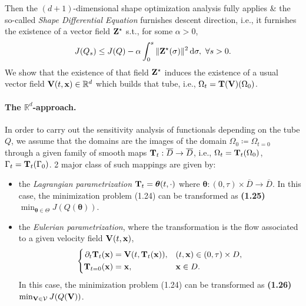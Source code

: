 \documentclass[oneside]{book}
\numberwithin{equation}{section}
\begin{document}
Then the $(d + 1)$-dimensional shape optimization analysis fully applies \& the so-called \textit{Shape Differential Equation} furnishes descent direction, i.e., it furnishes the existence of a vector field ${\bf Z}^\star$ s.t., for some $\alpha > 0$,
\begin{align*}
	J(Q_s)\le J(Q) - \alpha\int_0^s \|{\bf Z}^\star(\sigma)\|^2\,{\rm d}\sigma,\ \forall s > 0.
\end{align*}
We show that the existence of that field ${\bf Z}^\star$ induces the existence of a usual vector field ${\bf V}(t,{\bf x})\in\mathbb{R}^d$ which builds that tube, i.e., $\Omega_t = {\bf T}({\bf V})(\Omega_0)$.

\paragraph{The $\mathbb{R}^d$-approach.} In order to carry out the sensitivity analysis of functionals depending on the tube $Q$, we assume that the domains are the images of the domain $\Omega_0\coloneqq\Omega_{t = 0}$ through a given family of smooth maps ${\bf T}_t:\overline{D}\to\overline{D}$, i.e., $\Omega_t = {\bf T}_t(\Omega_0)$, $\Gamma_t = {\bf T}_t(\Gamma_0)$. 2 major class of such mappings are given by:
\begin{itemize}
	\item the \textit{Lagrangian parametrization} ${\bf T}_t = \boldsymbol{\theta}(t,\cdot)$ where $\boldsymbol{\theta}:(0,\tau)\times\overline{D}\to\overline{D}$. In this case, the minimization problem (1.24) can be transformed as \textbf{(1.25)} $\min_{\boldsymbol{\theta}\in\Theta} J(Q(\boldsymbol{\theta}))$.
	\item the \textit{Eulerian parametrization}, where the transformation is the flow associated to a given velocity field ${\bf V}(t,{\bf x})$,
	\begin{equation*}
		\left\{\begin{split}
			\partial_t{\bf T}_t({\bf x}) &= {\bf V}(t,{\bf T}_t({\bf x})),&&(t,{\bf x})\in(0,\tau)\times D,\\
			{\bf T}_{t=0}({\bf x}) &= {\bf x},&&{\bf x}\in D.
		\end{split}\right.
	\end{equation*}
	In this case, the minimization problem (1.24) can be transformed as \textbf{(1.26)} $\min_{{\bf V}\in\mathcal{V}} J(Q({\bf V}))$.
\end{itemize}
\end{document}
